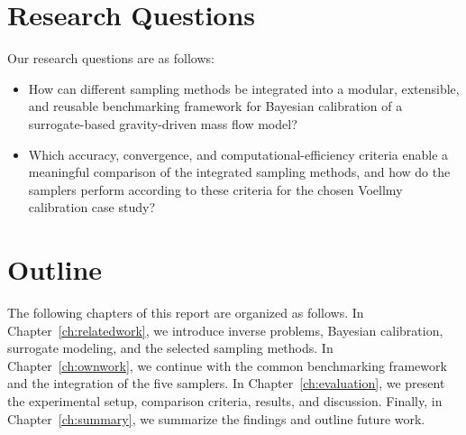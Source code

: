 \section{Research Questions}
\label{sec:research-questions}

Our research questions are as follows:
\begin{itemize}
  \item[\textit{RQ1}] How can different sampling methods be integrated into a modular, extensible, and reusable benchmarking framework for Bayesian calibration of a surrogate-based gravity-driven mass flow model?

  \item[\textit{RQ2}]
  Which accuracy, convergence, and computational-efficiency criteria enable a meaningful comparison of the integrated sampling methods, and how do the samplers perform according to these criteria for the chosen Voellmy calibration case study?
\end{itemize}

\section{Outline}
\label{sec:outline}

The following chapters of this report are organized as follows. In Chapter~\ref{ch:relatedwork}, we introduce inverse problems, Bayesian calibration, surrogate modeling, and the selected sampling methods. In Chapter~\ref{ch:ownwork}, we continue with the common benchmarking framework and the integration of the five samplers. In Chapter~\ref{ch:evaluation}, we present the experimental setup, comparison criteria, results, and discussion. Finally, in Chapter~\ref{ch:summary}, we summarize the findings and outline future work.
